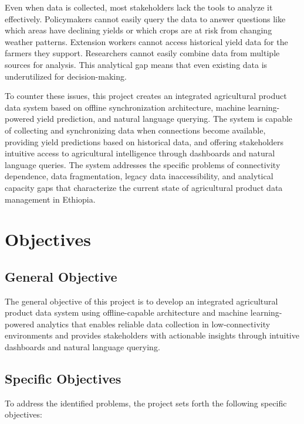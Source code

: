 Even when data is collected, most stakeholders lack the tools to analyze it effectively. Policymakers cannot easily query the data to answer questions like which areas have declining yields or which crops are at risk from changing weather patterns. Extension workers cannot access historical yield data for the farmers they support. Researchers cannot easily combine data from multiple sources for analysis. This analytical gap means that even existing data is underutilized for decision-making.

To counter these issues, this project creates an integrated agricultural product data system based on offline synchronization architecture, machine learning-powered yield prediction, and natural language querying. The system is capable of collecting and synchronizing data when connections become available, providing yield predictions based on historical data, and offering stakeholders intuitive access to agricultural intelligence through dashboards and natural language queries. The system addresses the specific problems of connectivity dependence, data fragmentation, legacy data inaccessibility, and analytical capacity gaps that characterize the current state of agricultural product data management in Ethiopia.

\section{Objectives}

\subsection{General Objective}

The general objective of this project is to develop an integrated agricultural product data system using offline-capable architecture and machine learning-powered analytics that enables reliable data collection in low-connectivity environments and provides stakeholders with actionable insights through intuitive dashboards and natural language querying.

\subsection{Specific Objectives}

To address the identified problems, the project sets forth the following specific objectives:

